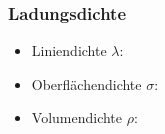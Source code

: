 \subsubsection*{Ladungsdichte}

\begin{itemize}
    \item Liniendichte $\lambda$: 
    \item Oberflächendichte $\sigma$: 
    \item Volumendichte $\rho$: 
\end{itemize}

